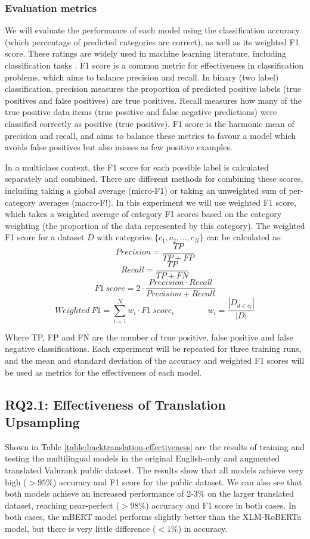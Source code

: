 \documentclass{l4proj}
\begin{document}
\subsubsection{Evaluation metrics}
We will evaluate the performance of each model using the classification accuracy (which percentage of predicted categories are correct), as well as its weighted F1 score. These ratings are widely used in machine learning literature, including classification tasks \citep{alam2020bangla, al2020multiple, ranasinghe2020multilingual}. F1 score is a common metric for effectiveness in classification problems, which aims to balance precision and recall. In binary (two label) classification, precision measures the proportion of predicted positive labels (true positives and false positives) are true positives. Recall measures how many of the true positive data items (true positive and false negative predictions) were classified correctly as positive (true positive). F1 score is the harmonic mean of precision and recall, and aims to balance these metrics to favour a model which avoids false positives but also misses as few positive examples. \par
In a multiclass context, the F1 score for each possible label is calculated separately and combined. There are different methods for combining these scores, including taking a global average (micro-F1) or taking an unweighted sum of per-category averages (macro-F!). In this experiment we will use weighted F1 score, which takes a weighted average of category F1 scores based on the category weighting (the proportion of the data represented by this category). The weighted F1 score for a dataset $D$ with categories $\{c_1, c_2, ..., c_N\}$ can be calculated as:
$$Precision=\frac{TP}{TP+FP}$$ 
$$Recall=\frac{TP}{TP+FN}
$$ $$F1 \ score=2 \cdot \frac{Precision \cdot Recall}{Precision + Recall}$$
$$Weighted \ F1=\sum_{i=1}^{N}w_i \cdot F1 \ score_i \quad \quad \quad \quad w_i=\frac{|D_{d \in c_i}|}{|D|}$$

Where TP, FP and FN are the number of true positive, false positive and false negative classifications. Each experiment will be repeated for three training runs, and the mean and standard deviation of the accuracy and weighted F1 scores will be used as metrics for the effectiveness of each model.

\subsection{RQ2.1: Effectiveness of Translation Upsampling}
Shown in Table \ref{table:backtranslation-effectiveness} are the results of training and testing the multilingual models in the original English-only and augmented translated Valurank public dataset. The results show that all models achieve very high ($>95\%$) accuracy and F1 score for the public dataset. We can also see that both models achieve an increased performance of 2-3\% on the larger translated dataset, reaching near-perfect ($>98\%$) accuracy and F1 score in both cases. In both cases, the mBERT model performs slightly better than the XLM-RoBERTa model, but there is very little difference ($<1\%$) in accuracy.
\end{document}
